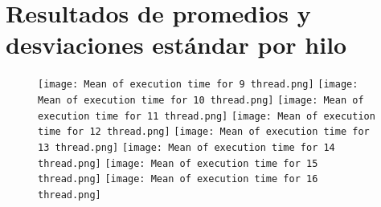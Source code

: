 \documentclass[a4paper,12pt]{article}
\begin{document}
  
    \section{Resultados de promedios y desviaciones estándar por hilo}
        \begin{figure}[ht]
    \centering
        \texttt{[image: Mean of execution time for 9 thread.png]}
        \texttt{[image: Mean of execution time for 10 thread.png]}
        \texttt{[image: Mean of      execution time for 11         thread.png]}
        \texttt{[image: Mean of execution time for 12 thread.png]}
        \texttt{[image: Mean of      execution time for 13         thread.png]}
        \texttt{[image: Mean of execution time for 14 thread.png]}
        \texttt{[image: Mean of      execution time for 15         thread.png]}
        \texttt{[image: Mean of execution time for 16 thread.png]}
    \end{figure}
\end{document}
